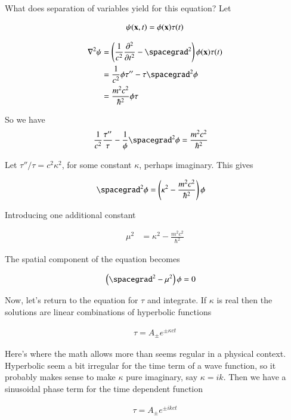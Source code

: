 \documentclass{article}
\newcommand{\PDSq}[2]{\frac{\partial^2 {#2}}{\partial {#1}^2}}
\begin{document}
What does separation of variables yield for this equation?  Let

\begin{align*}
\psi(\mathbf{x},t) = \phi(\mathbf{x})\tau(t)
\end{align*}

\begin{align*}
\grad^2 \psi
&= \left(\inv{c^2} \PDSq{t}{} - \spacegrad^2 \right) \phi(\Bx)\tau(t) \\
&= \inv{c^2} \phi\tau'' - \tau \spacegrad^2 \phi \\
&= \frac{m^2 c^2}{\hbar^2}\phi\tau
\end{align*}

So we have
\begin{align*}
\inv{c^2} \frac{\tau''}{\tau} - \inv{\phi} \spacegrad^2 \phi &= \frac{m^2 c^2}{\hbar^2}
\end{align*}

Let $\tau''/\tau = c^2 \kappa^2$, for some constant $\kappa$, perhaps imaginary. This gives

\begin{align*}
\spacegrad^2 \phi &= \left( \kappa^2 - \frac{m^2 c^2}{\hbar^2} \right) \phi
\end{align*}

Introducing one additional constant

\begin{align*}
\mu^2 &= \kappa^2 - \frac{m^2 c^2}{\hbar^2}
\end{align*}

The spatial component of the equation becomes

\begin{align*}
\left( \spacegrad^2 - \mu^2 \right) \phi &= 0
\end{align*}

Now, let's return to the equation for $\tau$ and integrate.  If $\kappa$ is real then the solutions are linear
combinations of hyperbolic functions

\begin{align*}
\tau = A_{\pm} e^{\pm \kappa c t}
\end{align*}

Here's where the math allows more than seems regular in a physical context.  Hyperbolic seem a bit irregular for the time term of a wave function, so it probably makes sense to make $\kappa$
pure imaginary, say $\kappa = i k$.  Then we have a sinusoidal phase term for the time dependent function

\begin{align*}
\tau = A_{\pm} e^{\pm i k c t}
\end{align*}
\end{document}
